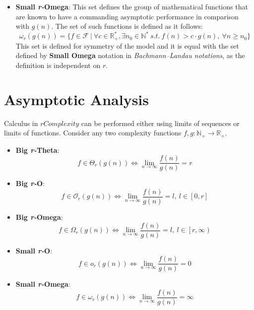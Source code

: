 \begin{itemize}
  \item \textbf{Small \textit{r-}Omega}:
  This set defines the group of mathematical functions that are known to have a commanding asymptotic performance in comparison with  $g(n)$.
  The set of such functions is defined as it follows:
  \[\omega_{r}(g(n)) = \lbrace f \in \mathcal{F}\ |\ \forall c \in \mathbb{R}^{*}_{+}, \exists n_{0} \in \mathbb{N}^{*}\ s.t.\  f(n) > c \cdot g(n),\  \forall n \geq n_{0} \rbrace\]
    This set is defined for symmetry of the model and it is equal with the set defined by \textbf{Small Omega} notation in \textit{Bachmann–Landau notations}, as the definition is independent on $r$.
\end{itemize}

\section{Asymptotic Analysis}
Calculus in $rComplexity$ can be performed either using limits of sequences or limits of functions. Consider any two complexity functions $f,g:\mathbb{N}_{+}\longrightarrow\mathbb{R}_{+}$.

\begin{itemize}
  \item \textbf{Big \textit{r-}Theta}: 
  \[ f \in \Theta_{r}(g(n)) \Leftrightarrow \lim_{n\to\infty} \dfrac{f(n)}{g(n)} = r \]

  \item \textbf{Big \textit{r-}O}: 
    \[ f \in \mathcal{O}_{r}(g(n)) \Leftrightarrow \lim_{n\to\infty} \dfrac{f(n)}{g(n)} = l,\ l \in \left[ 0, r \right] \]
  
  \item \textbf{Big \textit{r-}Omega}: 
      \[ f \in \Omega_{r}(g(n)) \Leftrightarrow \lim_{n\to\infty} \dfrac{f(n)}{g(n)} = l,\ l \in \left[ r, \infty \right) \]

  \item \textbf{Small \textit{r-}O}:
    \[ f \in o_{r}(g(n)) \Leftrightarrow \lim_{n\to\infty} \dfrac{f(n)}{g(n)} = 0 \]

  \item \textbf{Small \textit{r-}Omega}:
    \[ f \in \omega_{r}(g(n)) \Leftrightarrow \lim_{n\to\infty} \dfrac{f(n)}{g(n)} = \infty \]
    
\end{itemize}



